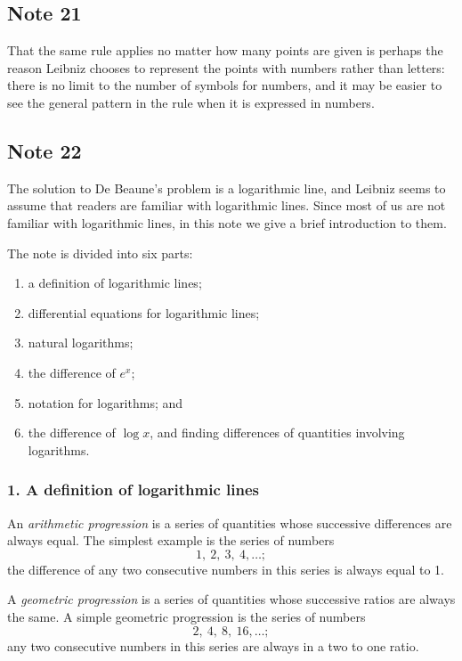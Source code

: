 \documentclass[twoside,openright]{article}
\begin{document}
\subsection*{Note 21}
\label{cnm21}

That the same rule applies no matter how many points are given is
perhaps the reason Leibniz chooses to represent the points with
numbers rather than letters: there is no limit to the number of
symbols for numbers, and it may be easier to see the general pattern
in the rule when it is expressed in numbers.

\subsection*{Note 22}
\label{bdebeaune}
\label{cnm22}
 
The solution to De Beaune's problem is a logarithmic line, and Leibniz
seems to assume that readers are familiar with logarithmic lines.
Since most of us are not familiar with logarithmic lines, in this note
we give a brief introduction to them.

The note is divided into six
parts:
\begin{enumerate}
\itemsep0em
\item a definition of logarithmic lines;
\item differential equations for logarithmic lines;
\item natural logarithms;
\item the difference of $e^x$;
\item notation for logarithms; and
\item the difference of $\log x$, and finding differences of quantities involving logarithms.
\end{enumerate}

\subsubsection*{1. A definition of logarithmic lines}

An {\em arithmetic progression} is a series of quantities whose
successive differences are always equal.  The simplest example is the
series of numbers
$$1,\ 2,\ 3,\ 4, \ldots;$$
the difference of any two consecutive numbers in this series is always equal to 1.

A {\em geometric progression} is a series of quantities whose
successive ratios are always the same.  A simple geometric progression
is the series of numbers
$$2,\ 4,\  8,\ 16, \ldots;$$
any two consecutive numbers in this series are always in a two to one ratio.
\end{document}

